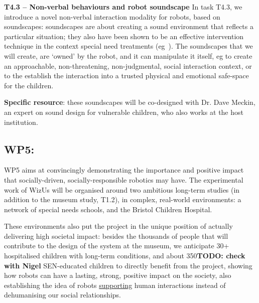 \documentclass[11pt,a4paper]{report}
\newcommand{\project}{WizUs\xspace}
\newcommand{\TODO}[1]{{\color{red}\textbf{TODO: #1}}}
\begin{document}
\textbf{T4.3 -- Non-verbal behaviours and robot soundscape} In task T4.3, we
introduce a novel non-verbal interaction modality for robots, based on
soundscapes: soundscapes are about creating a sound environment that reflects a
particular situation; they also have been shown to be an effective intervention
technique in the context special need treatments
(eg~\cite{greher2010soundscape}). The soundscapes that we will create, are
`owned' by the robot, and it can manipulate it itself, eg to create an
approachable, non-threatening, non-judgmental, social interaction context, or to
the establish the interaction into a trusted physical and emotional safe-space
for the children.

\textbf{Specific resource}: these soundscapes will be co-designed with Dr.
Dave Meckin, an expert on sound design for vulnerable children, who also works
at the host institution.

\subsection{WP5: \textbf{\wpFive}}


WP5 aims at convincingly demonstrating the importance and positive impact that
socially-driven, socially-responsible robotics may have. The experimental work
of \project will be organised around two ambitious long-term studies (in
addition to the museum study, T1.2), in complex, real-world environments: a
network of special needs schools, and the Bristol Children Hospital.

These environments also put the project in the unique position of actually
delivering high societal impact: besides the thousands of people that will
contribute to the design of the system at the museum, we anticipate 30+
hospitalised children with long-term conditions, and about 350\TODO{check with
Nigel} SEN-educated children to directly benefit from the project, showing how
robots can have a lasting, strong, positive impact on the society, also
establishing the idea of robots \ul{supporting} human interactions instead of
dehumanising our social relationships.
\end{document}
